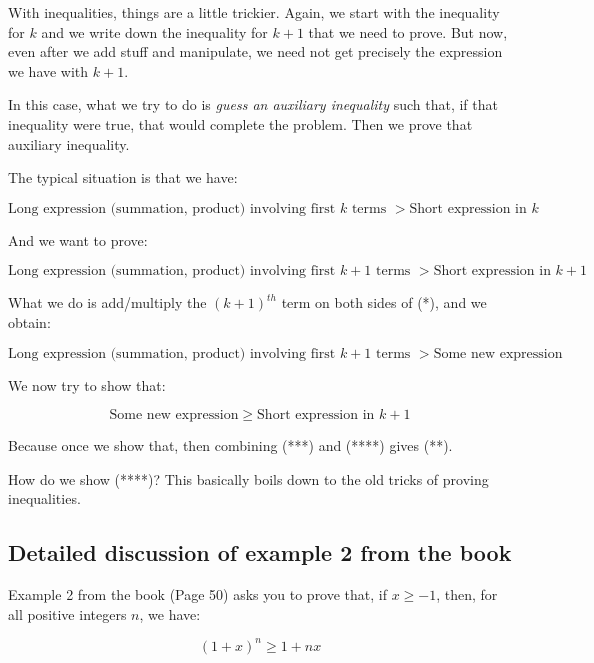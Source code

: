 \documentclass{amsart}
\begin{document}
With inequalities, things are a little trickier. Again, we start with
the inequality for $k$ and we write down the inequality for $k + 1$
that we need to prove. But now, even after we add stuff and
manipulate, we need not get precisely the expression we have with $k +
1$.

In this case, what we try to do is {\em guess an auxiliary inequality}
such that, if that inequality were true, that would complete the
problem. Then we prove that auxiliary inequality. 

The typical situation is that we have:

\begin{equation*}
  \text{Long expression (summation, product) involving first $k$ terms } > \text{Short expression in $k$} \tag{*}
\end{equation*}

And we want to prove:

\begin{equation*}
  \text{Long expression (summation, product) involving first $k + 1$ terms } > \text{Short expression in $k + 1$} \tag{**}
\end{equation*}

What we do is add/multiply the $(k+1)^{th}$ term on both sides of
(*), and we obtain:

\begin{equation*}
  \text{Long expression (summation, product) involving first $k + 1$ terms } > \text{Some new expression} \tag{***}
\end{equation*}

We now try to show that:

\begin{equation*}
  \text{Some new expression} \ge \text{Short expression in $k + 1$} \tag{****}
\end{equation*}

Because once we show that, then combining (***) and (****) gives (**).

How do we show (****)? This basically boils down to the old tricks
of proving inequalities.

\subsection*{Detailed discussion of example 2 from the book}

Example 2 from the book (Page 50) asks you to prove that, if $x \ge
-1$, then, for all positive integers $n$, we have:

$$(1 + x)^n \ge 1 + nx$$
\end{document}
